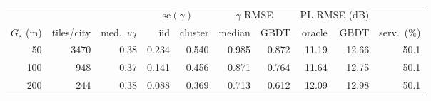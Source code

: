 \begin{tabular}{rrrrrrrrrr}
\toprule
& & & \multicolumn{2}{c}{$\mathrm{se}(\gamma)$} & \multicolumn{2}{c}{$\gamma$ RMSE} & \multicolumn{2}{c}{PL RMSE (dB)} & \\
\cmidrule(lr){4-5}\cmidrule(lr){6-7}\cmidrule(lr){8-9}
$G_s$ (m) & tiles/city & med.\ $w_t$ & iid & cluster & median & GBDT & oracle & GBDT & serv.\ (\%) \\
\midrule
50 & 3470 & 0.38 & 0.234 & 0.540 & 0.985 & 0.872 & 11.19 & 12.66 & 50.1 \\
100 & 948 & 0.37 & 0.141 & 0.456 & 0.871 & 0.764 & 11.64 & 12.75 & 50.1 \\
200 & 244 & 0.38 & 0.088 & 0.369 & 0.713 & 0.612 & 12.09 & 12.98 & 50.1 \\
\bottomrule
\end{tabular}
